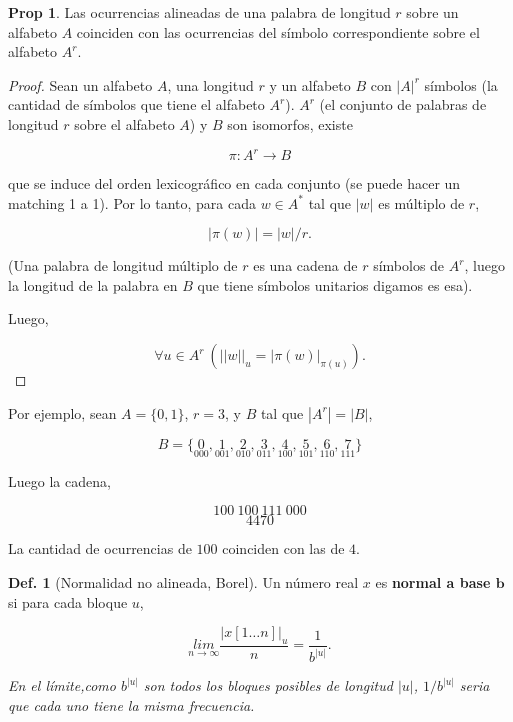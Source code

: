\documentclass{report}
\theoremstyle{definition} %
\newtheorem*{proposition*}{Prop}
\newtheorem{definition}{Def.}[chapter]
\begin{document}
\begin{proposition*}
    Las ocurrencias alineadas de una palabra de longitud $r$ sobre un alfabeto
    $A$ coinciden con las ocurrencias del símbolo correspondiente sobre el
    alfabeto $A^r$.
\end{proposition*}
\begin{proof}
    Sean un alfabeto $A$, una longitud $r$ y un alfabeto $B$ con $|A|^r$
    símbolos (la cantidad de símbolos que tiene el alfabeto $A^r$). $A^r$ (el
    conjunto de palabras de longitud $r$ sobre el alfabeto $A$) y $B$ son
    isomorfos, existe

    $$\pi: A^r \to B$$

    que se induce del orden lexicográfico en cada conjunto (se puede hacer un
    matching 1 a 1). Por lo tanto, para cada $w \in A^*$ tal que $|w|$ es
    múltiplo de $r$,

    $$|\pi(w)| = |w| / r.$$

    (Una palabra de longitud múltiplo de $r$ es una cadena de $r$ símbolos de
    $A^r$, luego la longitud de la palabra en $B$ que tiene símbolos unitarios
    digamos es esa).

    Luego,

    $$\forall u \in A^r \ (||w||_u = |\pi(w)|_{\pi(u)}).$$
\end{proof}

Por ejemplo, sean $A = \{0, 1\}$, $r = 3$, y $B$ tal que $|A^r| = |B|$,

$$B = \{
    \underset{000}{0},
    \underset{001}{1},
    \underset{010}{2},
    \underset{011}{3},
    \underset{100}{4},
    \underset{101}{5},
    \underset{110}{6},
    \underset{111}{7}
\}$$

Luego la cadena,

$$100\ 100\ 111\ 000$$
$$4470$$

La cantidad de ocurrencias de $100$ coinciden con las de $4$.

\begin{definition}[Normalidad no alineada, Borel]
    Un número real $x$ es \textbf{normal a base $\bm{b}$} si para cada bloque
    $u$,

    $$
    \underset{n \to \infty}{lim}
        \frac{|x[1\dots n]|_u}{n} =
        \frac{1}{b^{|u|}}.
    $$

    \textit{En el límite,como $b^{|u|}$ son todos los bloques posibles de
    longitud $|u|$, $1/b^{|u|}$ seria que cada uno tiene la misma frecuencia.}
\end{definition}
\end{document}
